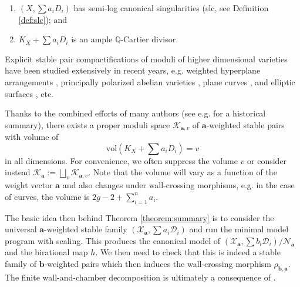 \documentclass[11pt]{amsart}
\theoremstyle{definition}
\theoremstyle{remark}
\newcommand{\bP}{{\mathbb P}}
\newcommand{\calX}{\mathcal X}
\newcommand{\calD}{\mathcal D}
\newcommand{\sK}{\mathscr{K}}
\newcommand{\sN}{\mathscr{N}}
\newcommand{\bfa}{\mathbf{a}}
\newcommand{\bfb}{\mathbf{b}}
\begin{document}
	\begin{enumerate} 
		
		\item $(X, \sum a_i D_i)$ has semi-log canonical singularities (slc, see Definition \ref{def:slc}); and
		\item $K_X + \sum a_i D_i$ is an ample $\mathbb{Q}$-Cartier divisor. 
	\end{enumerate} 
	Explicit stable pair compactifications of moduli of higher dimensional varieties have been studied extensively in recent years, e.g. weighted hyperplane arrangements \cite{hkt,Ale15}, principally polarized abelian varieties \cite{Ale02}, plane curves \cite{Hac04}, and elliptic surfaces \cite{AB17,Inc18}, etc.
	
	Thanks to the combined efforts of many authors (see e.g. \cite[30]{kollarmumford} for a historical summary), there exists a proper moduli space $\sK_{\bfa, v}$ of $\bfa$-weighted stable pairs with volume of $$\mathrm{vol}(K_X + \sum a_i D_i) = v$$
	in all dimensions. For convenience, we often suppress the volume $v$ or consider instead $\sK_{\bfa} := \bigsqcup_v \sK_{\bfa,v}$. Note that the volume will vary as a function of the weight vector $\bfa$ and also changes under wall-crossing morphisms, e.g. in the case of curves, the volume is $2g - 2 + \sum_{i = 1}^n a_i$. 
	
	The basic idea then behind Theorem \ref{theorem:summary} is to consider the universal $\bfa$-weighted stable  family $(\calX_\bfa, \sum a_i \calD_i)$ and run the minimal model program with scaling. This produces the canonical model of $(\calX_\bfa, \sum b_i \calD_i)/\sN_{\bfa}$ and the birational map $h$. We then need to check that this is indeed a stable family of $\bfb$-weighted pairs which then induces the wall-crossing morphism $\rho_{\bfb, \bfa}$. The finite wall-and-chamber decomposition is ultimately a consequence of \cite[Corollary 1.1.5]{BCHM10}.
	
\end{document}
